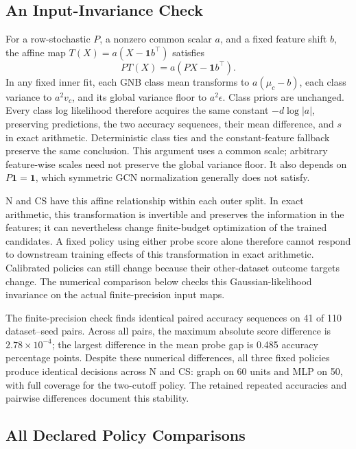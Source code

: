 \subsection{An Input-Invariance Check}

For a row-stochastic $P$, a nonzero common scalar $a$, and a fixed feature shift $b$, the affine map $T(X)=a(X-\mathbf{1}b^\top)$ satisfies
\begin{equation}
P T(X)=a(PX-\mathbf{1}b^\top).
\end{equation}
In any fixed inner fit, each GNB class mean transforms to $a(\mu_c-b)$, each class variance to $a^2v_c$, and its global variance floor to $a^2\epsilon$. Class priors are unchanged. Every class log likelihood therefore acquires the same constant $-d\log|a|$, preserving predictions, the two accuracy sequences, their mean difference, and $s$ in exact arithmetic. Deterministic class ties and the constant-feature fallback preserve the same conclusion. This argument uses a common scale; arbitrary feature-wise scales need not preserve the global variance floor. It also depends on $P\mathbf{1}=\mathbf{1}$, which symmetric GCN normalization generally does not satisfy.

N and CS have this affine relationship within each outer split. In exact arithmetic, this transformation is invertible and preserves the information in the features; it can nevertheless change finite-budget optimization of the trained candidates. A fixed policy using either probe score alone therefore cannot respond to downstream training effects of this transformation in exact arithmetic. Calibrated policies can still change because their other-dataset outcome targets change. The numerical comparison below checks this Gaussian-likelihood invariance on the actual finite-precision input maps.

The finite-precision check finds identical paired accuracy sequences on 41 of 110 dataset--seed pairs. Across all pairs, the maximum absolute score difference is $2.78\times10^{-4}$; the largest difference in the mean probe gap is 0.485 accuracy percentage points. Despite these numerical differences, all three fixed policies produce identical decisions across N and CS: graph on 60 units and MLP on 50, with full coverage for the two-cutoff policy. The retained repeated accuracies and pairwise differences document this stability.

\subsection{All Declared Policy Comparisons}


